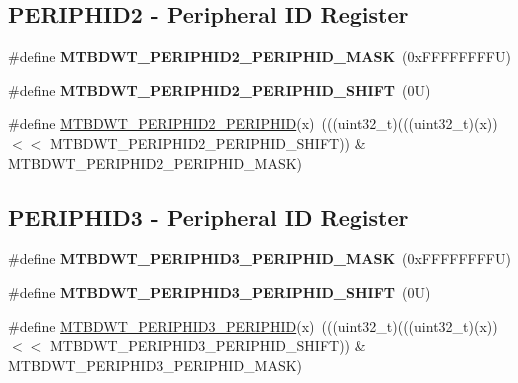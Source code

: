 \subsection*{P\+E\+R\+I\+P\+H\+I\+D2 -\/ Peripheral ID Register}
\begin{DoxyCompactItemize}
\item 
\mbox{\label{group___m_t_b___register___masks_ga7ff745cf5423b3e1a720239ec421175f}} 
\#define {\bfseries M\+T\+B\+D\+W\+T\+\_\+\+P\+E\+R\+I\+P\+H\+I\+D2\+\_\+\+P\+E\+R\+I\+P\+H\+I\+D\+\_\+\+M\+A\+SK}~(0x\+F\+F\+F\+F\+F\+F\+F\+F\+U)
\item 
\mbox{\label{group___m_t_b___register___masks_ga77e08c5a187edc60cbafbd3bcd99003f}} 
\#define {\bfseries M\+T\+B\+D\+W\+T\+\_\+\+P\+E\+R\+I\+P\+H\+I\+D2\+\_\+\+P\+E\+R\+I\+P\+H\+I\+D\+\_\+\+S\+H\+I\+FT}~(0\+U)
\item 
\#define \mbox{\hyperlink{group___m_t_b___register___masks_ga038c0bcc02aa1185f73a7be90dfe8249}{M\+T\+B\+D\+W\+T\+\_\+\+P\+E\+R\+I\+P\+H\+I\+D2\+\_\+\+P\+E\+R\+I\+P\+H\+ID}}(x)~(((uint32\+\_\+t)(((uint32\+\_\+t)(x)) $<$$<$ M\+T\+B\+D\+W\+T\+\_\+\+P\+E\+R\+I\+P\+H\+I\+D2\+\_\+\+P\+E\+R\+I\+P\+H\+I\+D\+\_\+\+S\+H\+I\+FT)) \& M\+T\+B\+D\+W\+T\+\_\+\+P\+E\+R\+I\+P\+H\+I\+D2\+\_\+\+P\+E\+R\+I\+P\+H\+I\+D\+\_\+\+M\+A\+SK)
\end{DoxyCompactItemize}
\subsection*{P\+E\+R\+I\+P\+H\+I\+D3 -\/ Peripheral ID Register}
\begin{DoxyCompactItemize}
\item 
\mbox{\label{group___m_t_b___register___masks_ga9323eb59d9a1018ebae28a7626bbd61b}} 
\#define {\bfseries M\+T\+B\+D\+W\+T\+\_\+\+P\+E\+R\+I\+P\+H\+I\+D3\+\_\+\+P\+E\+R\+I\+P\+H\+I\+D\+\_\+\+M\+A\+SK}~(0x\+F\+F\+F\+F\+F\+F\+F\+F\+U)
\item 
\mbox{\label{group___m_t_b___register___masks_ga9a4e4e9d8cde4f95dd05336786bb9ad3}} 
\#define {\bfseries M\+T\+B\+D\+W\+T\+\_\+\+P\+E\+R\+I\+P\+H\+I\+D3\+\_\+\+P\+E\+R\+I\+P\+H\+I\+D\+\_\+\+S\+H\+I\+FT}~(0\+U)
\item 
\#define \mbox{\hyperlink{group___m_t_b___register___masks_ga4ff280515681ada06bd251d8c9847c25}{M\+T\+B\+D\+W\+T\+\_\+\+P\+E\+R\+I\+P\+H\+I\+D3\+\_\+\+P\+E\+R\+I\+P\+H\+ID}}(x)~(((uint32\+\_\+t)(((uint32\+\_\+t)(x)) $<$$<$ M\+T\+B\+D\+W\+T\+\_\+\+P\+E\+R\+I\+P\+H\+I\+D3\+\_\+\+P\+E\+R\+I\+P\+H\+I\+D\+\_\+\+S\+H\+I\+FT)) \& M\+T\+B\+D\+W\+T\+\_\+\+P\+E\+R\+I\+P\+H\+I\+D3\+\_\+\+P\+E\+R\+I\+P\+H\+I\+D\+\_\+\+M\+A\+SK)
\end{DoxyCompactItemize}
